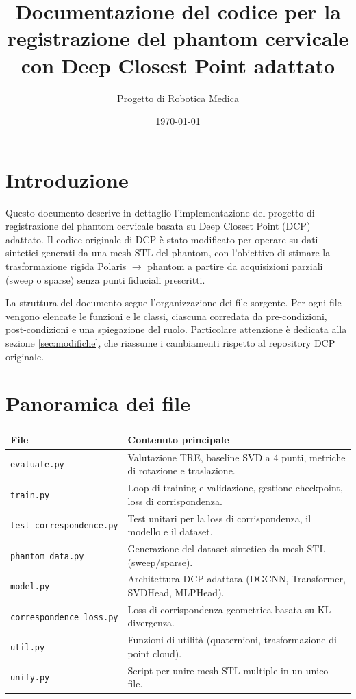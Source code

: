 \documentclass[11pt,a4paper]{article}
\title{Documentazione del codice per la registrazione del phantom cervicale con Deep Closest Point adattato}
\author{Progetto di Robotica Medica}
\date{\today}
\begin{document}
\maketitle
\tableofcontents
\newpage

\section{Introduzione}

Questo documento descrive in dettaglio l'implementazione del progetto di registrazione del phantom cervicale basata su Deep Closest Point (DCP) adattato. Il codice originale di DCP \cite{dcp} è stato modificato per operare su dati sintetici generati da una mesh STL del phantom, con l'obiettivo di stimare la trasformazione rigida Polaris \(\rightarrow\) phantom a partire da acquisizioni parziali (sweep o sparse) senza punti fiduciali prescritti.

La struttura del documento segue l'organizzazione dei file sorgente. Per ogni file vengono elencate le funzioni e le classi, ciascuna corredata da pre-condizioni, post-condizioni e una spiegazione del ruolo. Particolare attenzione è dedicata alla sezione \ref{sec:modifiche}, che riassume i cambiamenti rispetto al repository DCP originale.

\section{Panoramica dei file}

\begin{table}[h]
\centering
\begin{tabular}{@{}lp{10cm}@{}}
\toprule
File & Contenuto principale \\
\midrule
\texttt{evaluate.py} & Valutazione TRE, baseline SVD a 4 punti, metriche di rotazione e traslazione. \\
\texttt{train.py} & Loop di training e validazione, gestione checkpoint, loss di corrispondenza. \\
\texttt{test\_correspondence.py} & Test unitari per la loss di corrispondenza, il modello e il dataset. \\
\texttt{phantom\_data.py} & Generazione del dataset sintetico da mesh STL (sweep/sparse). \\
\texttt{model.py} & Architettura DCP adattata (DGCNN, Transformer, SVDHead, MLPHead). \\
\texttt{correspondence\_loss.py} & Loss di corrispondenza geometrica basata su KL divergenza. \\
\texttt{util.py} & Funzioni di utilità (quaternioni, trasformazione di point cloud). \\
\texttt{unify.py} & Script per unire mesh STL multiple in un unico file. \\
\bottomrule
\end{tabular}
\end{table}
\end{document}
